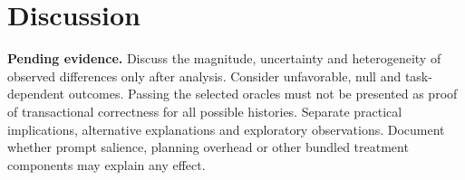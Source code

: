 \section{Discussion}
\textbf{Pending evidence.} Discuss the magnitude, uncertainty and heterogeneity of observed differences
only after analysis. Consider unfavorable, null and task-dependent outcomes. Passing the selected
oracles must not be presented as proof of transactional correctness for all possible histories.
Separate practical implications, alternative explanations and exploratory observations. Document
whether prompt salience, planning overhead or other bundled treatment components may explain any effect.
